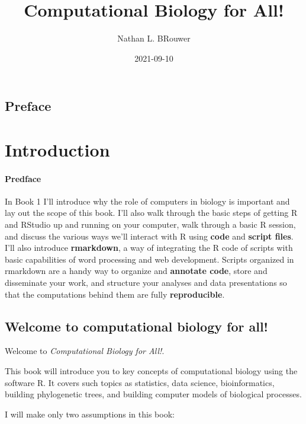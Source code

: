 \documentclass[
]{book}
\title{Computational Biology for All!}
\author{Nathan L. BRouwer}
\date{2021-09-10}
\begin{document}
\maketitle

{
\setcounter{tocdepth}{1}
\tableofcontents
}
\hypertarget{preface}{%
\chapter*{Preface}\label{preface}}

\hypertarget{part-introduction}{%
\part{Introduction}\label{part-introduction}}

\hypertarget{predface}{%
\subsection*{Predface}\label{predface}}

In Book 1 I'll introduce why the role of computers in biology is important and lay out the scope of this book. I'll also walk through the basic steps of getting R and RStudio up and running on your computer, walk through a basic R session, and discuss the various ways we'll interact with R using \textbf{code} and \textbf{script files}. I'll also introduce \textbf{rmarkdown}, a way of integrating the R code of scripts with basic capabilities of word processing and web development. Scripts organized in rmarkdown are a handy way to organize and \textbf{annotate code}, store and disseminate your work, and structure your analyses and data presentations so that the computations behind them are fully \textbf{reproducible}.

\hypertarget{intro}{%
\chapter{Welcome to computational biology for all!}\label{intro}}

Welcome to \emph{Computational Biology for All!}.

This book will introduce you to key concepts of computational biology using the software R. It covers such topics as statistics, data science, bioinformatics, building phylogenetic trees, and building computer models of biological processes.

I will make only two assumptions in this book:
\end{document}

